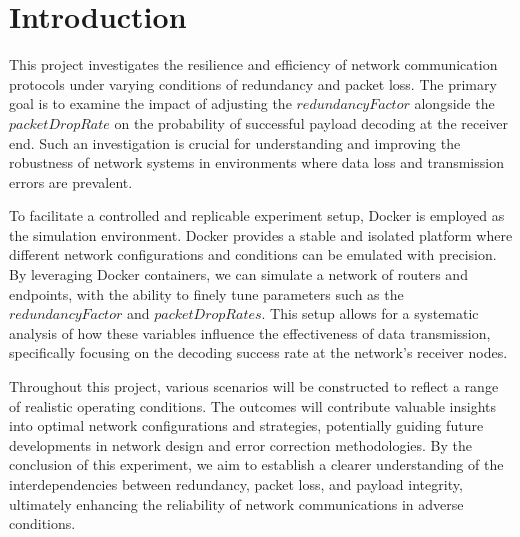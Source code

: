 
\section{Introduction}
\label{sec: intro}

This project investigates the resilience and efficiency of network communication protocols under varying conditions of redundancy and packet loss. The primary goal is to examine the impact of adjusting the $redundancyFactor$ alongside the $packetDropRate$ on the probability of successful payload decoding at the receiver end. Such an investigation is crucial for understanding and improving the robustness of network systems in environments where data loss and transmission errors are prevalent.

To facilitate a controlled and replicable experiment setup, Docker is employed as the simulation environment. Docker provides a stable and isolated platform where different network configurations and conditions can be emulated with precision. By leveraging Docker containers, we can simulate a network of routers and endpoints, with the ability to finely tune parameters such as the $redundancyFactor$ and $packetDropRates$. This setup allows for a systematic analysis of how these variables influence the effectiveness of data transmission, specifically focusing on the decoding success rate at the network's receiver nodes.

Throughout this project, various scenarios will be constructed to reflect a range of realistic operating conditions. The outcomes will contribute valuable insights into optimal network configurations and strategies, potentially guiding future developments in network design and error correction methodologies. By the conclusion of this experiment, we aim to establish a clearer understanding of the interdependencies between redundancy, packet loss, and payload integrity, ultimately enhancing the reliability of network communications in adverse conditions.

